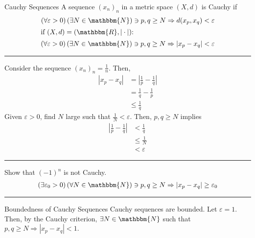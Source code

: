 \documentclass[10pt]{extarticle}
\newcommand{\N}{\mathbbm{N}}
\newcommand{\R}{\mathbbm{R}}
\begin{document}
  \begin{problem}{Cauchy Sequences}
    A sequence $(x_n)_n$ in a metric space $(X,d)$ is Cauchy if 
    \begin{align*}
      \left(\forall \varepsilon > 0\right)\left(\exists N\in\N\right) \ni p,q\geq N \Rightarrow d(x_p,x_q) < \varepsilon\\
      \shortintertext{if $(X,d) = (\R,|\cdot|)$:}
      \left(\forall \varepsilon > 0\right)\left(\exists N\in\N\right) \ni p,q\geq N \Rightarrow |x_p-x_q| < \varepsilon
    \end{align*}
    \vspace{4pt}
    \rule{\textwidth}{0.4pt}
    \vspace{4pt}
    Consider the sequence $(x_n)_n = \frac{1}{n}$. Then,
    \begin{align*}
      |x_p - x_q| &= \left|\frac{1}{p}-\frac{1}{q}\right|\\
                  &= \frac{1}{q}-\frac{1}{p}\\
                  &\leq \frac{1}{q}
    \end{align*}
    Given $\varepsilon > 0$, find $N$ large such that $\frac{1}{N}< \varepsilon$. Then, $p,q\geq N$ implies
    \begin{align*}
      \left|\frac{1}{p}-\frac{1}{q}\right|& < \frac{1}{q}\\
                                          &\leq \frac{1}{N}\\
                                          &< \varepsilon
    \end{align*}
    \vspace{4pt}
    \rule{\textwidth}{0.4pt}
    \vspace{4pt}
    Show that $(-1)^n$ is not Cauchy.
    \begin{align*}
      \left(\exists \varepsilon_0 > 0\right)\left(\forall N\in\N\right) \ni p,q\geq N \Rightarrow |x_p - x_q| \geq \varepsilon_0
    \end{align*}
    \vspace{4pt}
    \rule{\textwidth}{0.4pt}
    \vspace{4pt}
    \begin{problem}{Boundedness of Cauchy Sequences}
      Cauchy sequences are bounded.
      \tcblower
      Let $\varepsilon = 1$. Then, by the Cauchy criterion, $\exists N\in\N$ such that $p,q\geq N \Rightarrow |x_p-x_q| < 1$.\\


\end{problem}
\end{problem}
\end{document}

